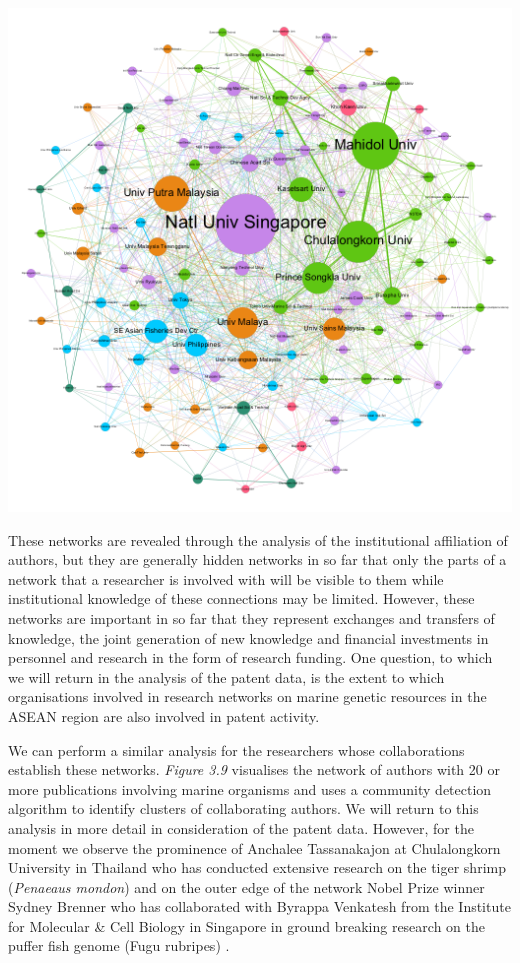 \documentclass[]{book}
\theoremstyle{definition}
\theoremstyle{definition}
\theoremstyle{definition}
\theoremstyle{remark}
\begin{document}
\includegraphics[width=14.22in]{images/aseanmarinlit_organisations_gephi}

These networks are revealed through the analysis of the institutional
affiliation of authors, but they are generally hidden networks in so far
that only the parts of a network that a researcher is involved with will
be visible to them while institutional knowledge of these connections
may be limited. However, these networks are important in so far that
they represent exchanges and transfers of knowledge, the joint
generation of new knowledge and financial investments in personnel and
research in the form of research funding. One question, to which we will
return in the analysis of the patent data, is the extent to which
organisations involved in research networks on marine genetic resources
in the ASEAN region are also involved in patent activity.

We can perform a similar analysis for the researchers whose
collaborations establish these networks. \emph{Figure 3.9} visualises
the network of authors with 20 or more publications involving marine
organisms and uses a community detection algorithm to identify clusters
of collaborating authors. We will return to this analysis in more detail
in consideration of the patent data. However, for the moment we observe
the prominence of Anchalee Tassanakajon at Chulalongkorn University in
Thailand who has conducted extensive research on the tiger shrimp
(\emph{Penaeaus mondon}) and on the outer edge of the network Nobel
Prize winner Sydney Brenner who has collaborated with Byrappa Venkatesh
from the Institute for Molecular \& Cell Biology in Singapore in ground
breaking research on the puffer fish genome (Fugu rubripes)
\citep{Brenner_1993}.
\end{document}
